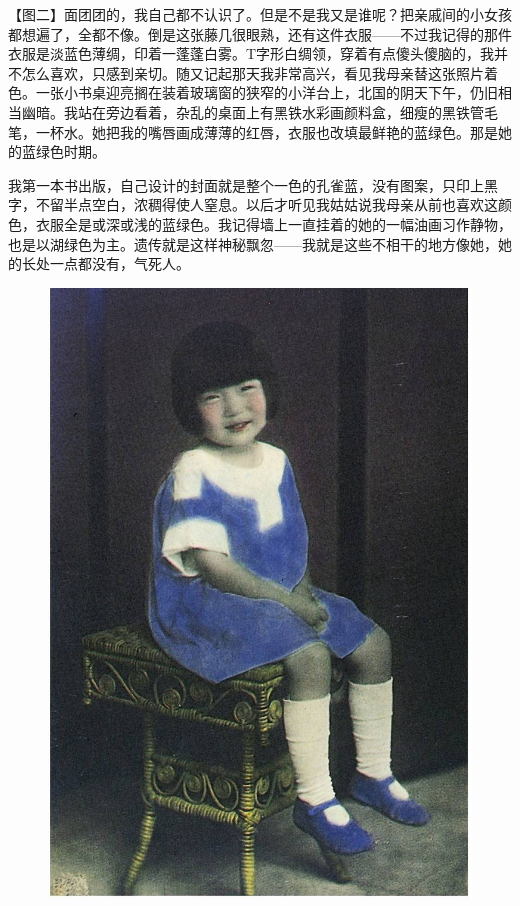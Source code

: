 \clearpage
\par 【图二】面团团的，我自己都不认识了。但是不是我又是谁呢？把亲戚间的小女孩都想遍了，全都不像。倒是这张藤几很眼熟，还有这件衣服——不过我记得的那件衣服是淡蓝色薄绸，印着一蓬蓬白雾。T字形白绸领，穿着有点傻头傻脑的，我并不怎么喜欢，只感到亲切。随又记起那天我非常高兴，看见我母亲替这张照片着色。一张小书桌迎亮搁在装着玻璃窗的狭窄的小洋台上，北国的阴天下午，仍旧相当幽暗。我站在旁边看着，杂乱的桌面上有黑铁水彩画颜料盒，细瘦的黑铁管毛笔，一杯水。她把我的嘴唇画成薄薄的红唇，衣服也改填最鲜艳的蓝绿色。那是她的蓝绿色时期。
\par 我第一本书出版，自己设计的封面就是整个一色的孔雀蓝，没有图案，只印上黑字，不留半点空白，浓稠得使人窒息。以后才听见我姑姑说我母亲从前也喜欢这颜色，衣服全是或深或浅的蓝绿色。我记得墙上一直挂着的她的一幅油画习作静物，也是以湖绿色为主。遗传就是这样神秘飘忽——我就是这些不相干的地方像她，她的长处一点都没有，气死人。
\begin{figure}[htb]
    \centering %
    \includegraphics[scale=0.4]{picture/对照记2.jpeg}
\end{figure}


